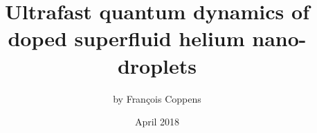 \title{Ultrafast quantum dynamics of doped superfluid helium nano-droplets}
\author{by Fran\c{c}ois Coppens}
\date{April 2018}
\maketitle
